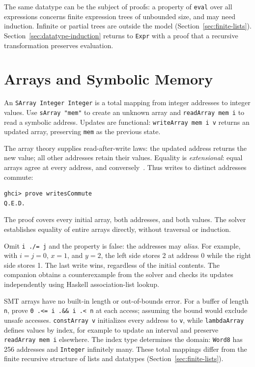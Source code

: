 \documentclass[acmsmall,screen,review,anonymous,nonacm]{acmart}
\newcommand{\code}[1]{\texttt{#1}}
\begin{document}
The same datatype can be the subject of proofs: a property of \code{eval} over
all expressions concerns finite expression trees of unbounded size, and may
need induction. Infinite or partial trees are outside the model
(Section~\ref{sec:finite-lists}). Section~\ref{sec:datatype-induction} returns to
\code{Expr} with a proof that a recursive transformation preserves evaluation.

\section{Arrays and Symbolic Memory}
\label{sec:arrays}

An \code{SArray Integer Integer} is a total mapping from integer addresses to
integer values. Use \code{sArray "mem"} to create an unknown array and
\code{readArray mem i} to read a symbolic address. Updates are functional:
\code{writeArray mem i v} returns an updated array, preserving \code{mem} as
the previous state.

The array theory supplies read-after-write laws: the updated address returns
the new value; all other addresses retain their values. Equality is
\emph{extensional}: equal arrays agree at every address, and
conversely~\citep{smtarrays}. Thus writes to distinct addresses commute:
\begin{lstlisting}[style=output]
ghci> prove writesCommute
Q.E.D.
\end{lstlisting}
The proof covers every initial array, both addresses, and both values. The solver
establishes equality of entire arrays directly, without traversal or induction.

Omit \code{i ./= j} and the property is false: the addresses may \emph{alias}.
For example, with $i=j=0$, $x=1$, and $y=2$, the left side stores 2 at address
0 while the right side stores 1. The last write wins, regardless of the initial
contents. The companion obtains a counterexample from the solver and checks
its updates independently using Haskell association-list lookup.

SMT arrays have no built-in length or out-of-bounds error. For a buffer of length
\code{n}, prove \code{0 .<= i .\&\& i .< n} at each access; assuming the bound
would exclude unsafe accesses. \code{constArray v} initializes every address to
\code{v}, while \code{lambdaArray} defines values by index, for example to update
an interval and preserve \code{readArray mem i} elsewhere.
The index type determines the domain: \code{Word8} has 256 addresses and
\code{Integer} infinitely many. These total mappings differ from the finite
recursive structure of lists and datatypes (Section~\ref{sec:finite-lists}).
\end{document}
